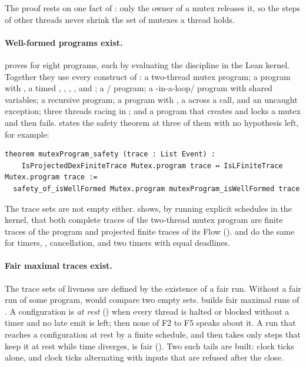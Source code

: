 The proof rests on one fact of \Lang{}: only the owner of a mutex releases
it, so the steps of other threads never shrink the set of mutexes a thread
holds.

\paragraph{Well-formed programs exist.}
 proves  for eight
programs, each by evaluating the discipline in the Lean kernel. Together
they use every construct of \Lang{}: a two-thread mutex program; a program
with , a timed , , , ,
and ; a / program; a
-in-a-loop/ program with shared variables; a
recursive program; a program with , a  across a call, and
an uncaught exception; three threads racing in ; and a program
that creates and locks a mutex and then fails.
 states the safety theorem at three of
them with no hypothesis left, for example:

\begin{Verbatim}
theorem mutexProgram_safety (trace : List Event) :
    IsProjectedDexFiniteTrace Mutex.program trace ↔ IsLFiniteTrace Mutex.program trace :=
  safety_of_isWellFormed Mutex.program mutexProgram_isWellFormed trace
\end{Verbatim}

The trace sets are not empty either.  shows, by
running explicit schedules in the kernel, that both complete traces of the
two-thread mutex program are finite traces of the program and projected
finite traces of its Flow ().
 and  do the
same for timers, , cancellation, and two timers with equal
deadlines.

\paragraph{Fair maximal traces exist.}
The trace sets of liveness are defined by the existence of a fair run.
Without a fair run of some program,  would
compare two empty sets.  builds fair
maximal runs of \Lang{}. A configuration is \emph{at rest}
() when every thread is halted or blocked without a
timer and no late emit is left; then none of F2 to F5 speaks about it. A
run that reaches a configuration at rest by a finite schedule, and then
takes only steps that keep it at rest while time diverges, is fair
(). Two such tails are built: clock
ticks alone, and clock ticks alternating with inputs that are refused after
the close.

